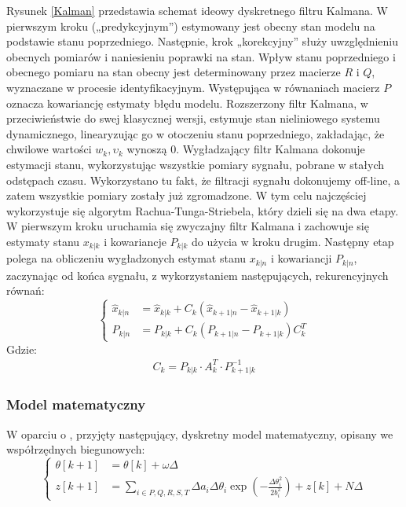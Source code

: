 Rysunek \ref{Kalman} przedstawia schemat ideowy dyskretnego filtru Kalmana. W pierwszym kroku („predykcyjnym”) estymowany jest obecny stan modelu na podstawie stanu poprzedniego. Następnie, krok „korekcyjny” służy uwzględnieniu obecnych pomiarów i naniesieniu poprawki na stan. Wpływ stanu poprzedniego i obecnego pomiaru na stan obecny jest determinowany przez macierze $R$ i $Q$, wyznaczane w procesie identyfikacyjnym. Występująca w równaniach macierz $P$ oznacza kowariancję estymaty błędu modelu. Rozszerzony filtr Kalmana, w przeciwieństwie do swej klasycznej wersji, estymuje stan nieliniowego systemu dynamicznego, linearyzując go w otoczeniu stanu poprzedniego, zakładając, że chwilowe wartości $w_k, \upsilon_k$ wynoszą 0. 
Wygładzający filtr Kalmana dokonuje estymacji stanu, wykorzystując wszystkie pomiary sygnału, pobrane w stałych odstępach czasu. Wykorzystano tu fakt, że filtracji sygnału dokonujemy off-line, a zatem wszystkie pomiary zostały już zgromadzone. W tym celu najczęściej wykorzystuje się algorytm Rachua-Tunga-Striebela, który dzieli się na dwa etapy. W pierwszym kroku uruchamia się zwyczajny filtr Kalmana i zachowuje się estymaty stanu $x_{k|k}$ i kowariancje $P_{k|k}$ do użycia w kroku drugim. Następny etap polega na obliczeniu wygładzonych estymat stanu $x_{k|n}$ i kowariancji $P_{k|n}$, zaczynając od końca sygnału, z wykorzystaniem następujących, rekurencyjnych równań:
\begin{equation}
\begin{cases}
	\hat{x}_{k|n} &= \hat{x}_{k|k} + C_k(\hat{x}_{k+1|n} - \hat{x}_{k+1|k}) \\
	P_{k|n} &= P_{k|k} + C_k(P_{k+1|n} - P_{k+1|k})C_{k}^T
\end{cases}
\end{equation}
Gdzie:
\begin{equation}
\begin{split}
	C_k = P_{k|k} \cdot A_{k}^T \cdot P_{k+1|k} ^{-1}
\end{split}
\end{equation}

\subsubsection{Model matematyczny}
W oparciu o \cite{Sameni2005-1}, przyjęty następujący, dyskretny model matematyczny, opisany we współrzędnych biegunowych:
\begin{equation}
\begin{cases}
	\theta[k+1] &= \theta[k] + \omega \Delta \\
	z[k+1] &= \sum_{i \in {P, Q, R, S, T} } \Delta a_i \Delta \theta_i \exp \left({- \frac{\Delta \theta_i^2}{2 b_i^2}} \right) + z[k] + N \Delta
\end{cases}
\label{eq:model1}
\end{equation}

